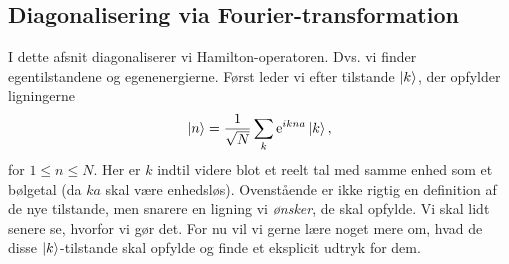 \documentclass[11pt, a4paper]{article}
\def\te{{\rm e}}
\begin{document}
\subsection{Diagonalisering via Fourier-transformation}
I dette afsnit diagonaliserer vi Hamilton-operatoren. Dvs. vi finder egentilstandene og egenenergierne. Først leder vi efter tilstande $\ket{k}$, der opfylder ligningerne
\begin{equation}
\ket{n} = \frac{1}{\sqrt{N}}\sum_{k} \te^{ik na} \ket{k},
\label{eq.invers_fourier_transform}
\end{equation}
for $1 \leq n \leq N$. Her er $k$ indtil videre blot et reelt tal med samme enhed som et bølgetal (da $ka$ skal være enhedsløs). Ovenstående er ikke rigtig en definition af de nye tilstande, men snarere en ligning vi \textit{ønsker}, de skal opfylde. Vi skal lidt senere se, hvorfor vi gør det. For nu vil vi gerne lære noget mere om, hvad de disse $\ket{k}$-tilstande skal opfylde og finde et eksplicit udtryk for dem.  
\end{document}
